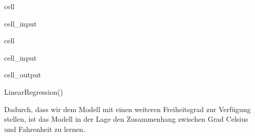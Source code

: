 \documentclass[letterpaper,10pt,english]{jupyterBook}
\begin{document}
\begin{sphinxuseclass}{cell}\begin{sphinxVerbatimInput}

\begin{sphinxuseclass}{cell_input}
\begin{sphinxVerbatim}[commandchars=\\\{\}]
  \PYG{p}{[}
    \PYG{p}{[}\PYG{p}{]}
    \PYG{p}{[}\PYG{p}{]}
    \PYG{p}{[}\PYG{p}{]}
\PYG{p}{]}

  \PYG{p}{[}
\PYG{p}{]}
\end{sphinxVerbatim}

\end{sphinxuseclass}\end{sphinxVerbatimInput}

\end{sphinxuseclass}
\begin{sphinxuseclass}{cell}\begin{sphinxVerbatimInput}

\begin{sphinxuseclass}{cell_input}
\begin{sphinxVerbatim}[commandchars=\\\{\}]
   
    
 
\end{sphinxVerbatim}

\end{sphinxuseclass}\end{sphinxVerbatimInput}
\begin{sphinxVerbatimOutput}

\begin{sphinxuseclass}{cell_output}
\begin{sphinxVerbatim}[commandchars=\\\{\}]
LinearRegression()
\end{sphinxVerbatim}

\end{sphinxuseclass}\end{sphinxVerbatimOutput}

\end{sphinxuseclass}
\sphinxAtStartPar
Dadurch, dass wir dem Modell mit  einen weiteren Freiheitsgrad zur Verfügung stellen, ist das Modell in der Lage den Zusammenhang zwischen Grad Celsius und Fahrenheit zu lernen.
\end{document}
